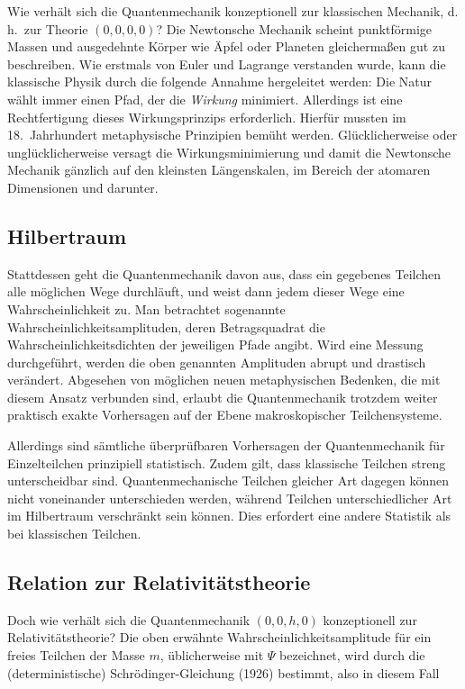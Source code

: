 \documentclass{scrartcl}
\begin{document}
Wie verhält sich die Quantenmechanik konzeptionell zur klassischen Mechanik, d.\,h.\ zur Theorie $(0,0,0,0)$? Die Newtonsche Mechanik scheint punktförmige Massen und ausgedehnte Körper wie Äpfel oder Planeten gleichermaßen gut zu beschreiben. Wie erstmals von Euler und Lagrange verstanden wurde, kann die klassische Physik durch die folgende Annahme hergeleitet werden: Die Natur wählt immer einen Pfad, der die \emph{Wirkung} minimiert. Allerdings ist eine Rechtfertigung dieses Wirkungsprinzips erforderlich. Hierfür mussten im 18.\ Jahrhundert metaphysische Prinzipien bemüht werden. Glücklicherweise oder unglücklicherweise versagt die Wirkungsminimierung und damit die Newtonsche Mechanik gänzlich auf den kleinsten Längenskalen, im Bereich der atomaren Dimensionen und darunter.


\subsection*{Hilbertraum}

Stattdessen geht die Quantenmechanik davon aus, dass ein gegebenes Teilchen alle möglichen Wege durchläuft, und weist dann jedem dieser Wege eine Wahrscheinlichkeit zu. Man betrachtet sogenannte Wahrscheinlichkeitsamplituden, deren Betragsquadrat die Wahrscheinlichkeitsdichten der jeweiligen Pfade angibt. Wird eine Messung durchgeführt, werden die oben genannten Amplituden abrupt und drastisch verändert. Abgesehen von möglichen neuen metaphysischen Bedenken, die mit diesem Ansatz verbunden sind, erlaubt die Quantenmechanik trotzdem weiter praktisch exakte Vorhersagen auf der Ebene makroskopischer Teilchensysteme.

Allerdings sind sämtliche überprüfbaren Vorhersagen der Quantenmechanik für Einzelteilchen prinzipiell statistisch. Zudem gilt, dass klassische Teilchen streng unterscheidbar sind. Quantenmechanische Teilchen gleicher Art dagegen können nicht voneinander unterschieden werden, während Teilchen unterschiedlicher Art im Hilbertraum verschränkt sein können. Dies erfordert eine andere Statistik als bei klassischen Teilchen.


\subsection*{Relation zur Relativitätstheorie}

Doch wie verhält sich die Quantenmechanik $(0,0,h,0)$ konzeptionell zur Relativitätstheorie? Die oben erwähnte Wahrscheinlichkeitsamplitude für ein freies Teilchen der Masse $m$, üblicherweise mit $\Psi$ bezeichnet, wird durch die (deterministische) Schrödinger-Gleichung (1926) bestimmt, also in diesem Fall
\end{document}
